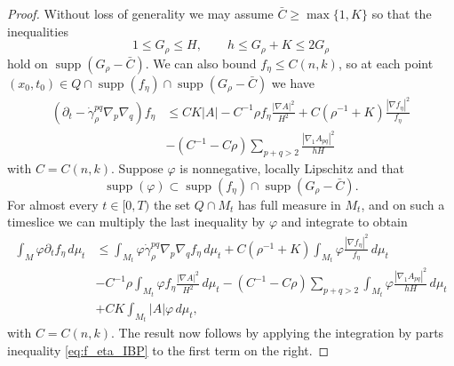 \documentclass[12pt]{amsart}
\DeclareMathOperator{\supp}{supp}
\begin{document}
\begin{proof}
Without loss of generality we may assume $\bar C \geq \max\{1,K\}$ so that the inequalities
\[1 \leq G_\rho \leq H, \qquad h \leq G_\rho + K \leq 2 G_\rho\]
hold on $\supp(G_\rho - \bar C)$. We can also bound $f_\eta \leq C(n,k)$, so at each point $(x_0, t_0) \in Q \cap \supp(f_\eta)\cap  \supp(G_\rho - \bar C)$ we have 
\begin{align*}
(\partial_t - \dot \gamma_\rho^{pq} \nabla_p \nabla_q) f_\eta & \leq CK|A| - C^{-1} \rho f_\eta \frac{|\nabla A|^2}{H^2} + C(\rho^{-1} + K )  \frac{|\nabla f_\eta|^2}{ f_\eta}\\
&-(C^{-1}- C \rho) \sum_{p+q> 2} \frac{|\nabla_1 A_{pq}|^2}{h H}
\end{align*}
with $C = C(n,k)$. Suppose $\varphi$ is nonnegative, locally Lipschitz and that 
\[\supp(\varphi) \subset \supp(f_\eta) \cap \supp(G_\rho - \bar C).\] 
For almost every $t \in [0,T)$ the set $Q \cap M_t$ has full measure in $M_t$, and on such a timeslice we can multiply the last inequality by $\varphi$ and integrate to obtain 
\begin{align*}
\int_M \varphi \partial_t f_\eta \, d\mu_t &\leq  \int_{M_t} \varphi \dot \gamma_\rho^{pq} \nabla_p \nabla_q f_\eta \,d\mu_t + C(\rho^{-1} + K) \int_{M_t} \varphi \frac{|\nabla f_\eta|^2}{f_\eta} \,d\mu_t \\
&- C^{-1} \rho \int_{M_t} \varphi f_\eta \frac{|\nabla A|^2}{H^2} \,d\mu_t  - (C^{-1} - C\rho) \sum_{p+q>2} \int_{M_t}\varphi \frac{|\nabla_1 A_{pq}|^2}{hH} \,d\mu_t\\
& + CK\int_{M_t} |A|\varphi\,d\mu_t ,
\end{align*}
with $C=C(n,k)$. The result now follows by applying the integration by parts inequality \eqref{eq:f_eta_IBP} to the first term on the right. 
\end{proof}
\end{document}
